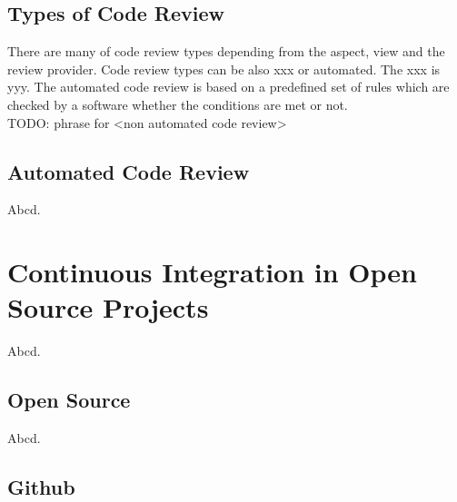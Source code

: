 \section{Types of Code Review}

There are many of code review types depending from the aspect, view and the review provider. Code review types can be also {\color{red}xxx} or automated. The {\color{red}xxx} is {\color{red}yyy}. The automated code review is based on a predefined set of rules which are checked by a software whether the conditions are met or not.\\

{\color{red}TODO: phrase for <non automated code review>}

\section{Automated Code Review}

Abcd.

\chapter{Continuous Integration in Open Source Projects}

Abcd.

\section{Open Source}

Abcd.

\section{Github}

